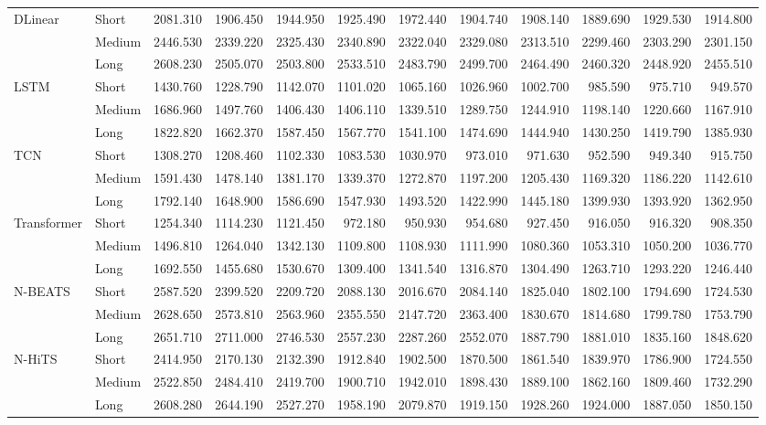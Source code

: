 \begin{table}[ht]
\begin{tabular}{llrrrrrrrrrr}
\cline{1-12}
\multirow[t]{3}{*}{DLinear} & Short & 2081.310 & 1906.450 & 1944.950 & 1925.490 & 1972.440 & 1904.740 & 1908.140 & 1889.690 & 1929.530 & 1914.800 \\
 & Medium & 2446.530 & 2339.220 & 2325.430 & 2340.890 & 2322.040 & 2329.080 & 2313.510 & 2299.460 & 2303.290 & 2301.150 \\
 & Long & 2608.230 & 2505.070 & 2503.800 & 2533.510 & 2483.790 & 2499.700 & 2464.490 & 2460.320 & 2448.920 & 2455.510 \\
\cline{1-12}
\multirow[t]{3}{*}{LSTM} & Short & 1430.760 & 1228.790 & 1142.070 & 1101.020 & 1065.160 & 1026.960 & 1002.700 & 985.590 & 975.710 & 949.570 \\
 & Medium & 1686.960 & 1497.760 & 1406.430 & 1406.110 & 1339.510 & 1289.750 & 1244.910 & 1198.140 & 1220.660 & 1167.910 \\
 & Long & 1822.820 & 1662.370 & 1587.450 & 1567.770 & 1541.100 & 1474.690 & 1444.940 & 1430.250 & 1419.790 & 1385.930 \\
\cline{1-12}
\multirow[t]{3}{*}{TCN} & Short & 1308.270 & 1208.460 & 1102.330 & 1083.530 & 1030.970 & 973.010 & 971.630 & 952.590 & 949.340 & 915.750 \\
 & Medium & 1591.430 & 1478.140 & 1381.170 & 1339.370 & 1272.870 & 1197.200 & 1205.430 & 1169.320 & 1186.220 & 1142.610 \\
 & Long & 1792.140 & 1648.900 & 1586.690 & 1547.930 & 1493.520 & 1422.990 & 1445.180 & 1399.930 & 1393.920 & 1362.950 \\
\cline{1-12}
\multirow[t]{3}{*}{Transformer} & Short & 1254.340 & 1114.230 & 1121.450 & 972.180 & 950.930 & 954.680 & 927.450 & 916.050 & 916.320 & 908.350 \\
 & Medium & 1496.810 & 1264.040 & 1342.130 & 1109.800 & 1108.930 & 1111.990 & 1080.360 & 1053.310 & 1050.200 & 1036.770 \\
 & Long & 1692.550 & 1455.680 & 1530.670 & 1309.400 & 1341.540 & 1316.870 & 1304.490 & 1263.710 & 1293.220 & 1246.440 \\
\cline{1-12}
\multirow[t]{3}{*}{N-BEATS} & Short & 2587.520 & 2399.520 & 2209.720 & 2088.130 & 2016.670 & 2084.140 & 1825.040 & 1802.100 & 1794.690 & 1724.530 \\
 & Medium & 2628.650 & 2573.810 & 2563.960 & 2355.550 & 2147.720 & 2363.400 & 1830.670 & 1814.680 & 1799.780 & 1753.790 \\
 & Long & 2651.710 & 2711.000 & 2746.530 & 2557.230 & 2287.260 & 2552.070 & 1887.790 & 1881.010 & 1835.160 & 1848.620 \\
\cline{1-12}
\multirow[t]{3}{*}{N-HiTS} & Short & 2414.950 & 2170.130 & 2132.390 & 1912.840 & 1902.500 & 1870.500 & 1861.540 & 1839.970 & 1786.900 & 1724.550 \\
 & Medium & 2522.850 & 2484.410 & 2419.700 & 1900.710 & 1942.010 & 1898.430 & 1889.100 & 1862.160 & 1809.460 & 1732.290 \\
 & Long & 2608.280 & 2644.190 & 2527.270 & 1958.190 & 2079.870 & 1919.150 & 1928.260 & 1924.000 & 1887.050 & 1850.150 \\
\cline{1-12}
\bottomrule
\end{tabular}
\end{table}
